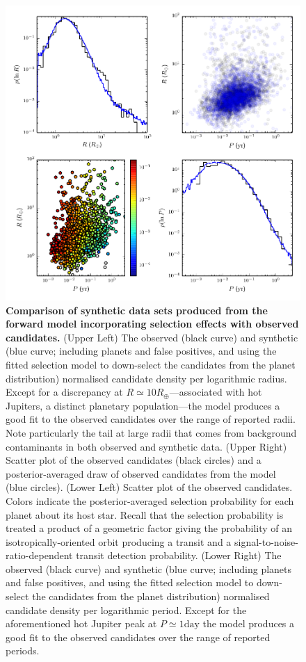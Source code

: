 \documentclass{nature}
\newcommand{\REarth}{R_\oplus}
\begin{document}
\begin{figure}
  \includegraphics[width=\columnwidth]{selection}
  \caption{\label{fig:selection} \textbf{Comparison of synthetic data
      sets produced from the forward model incorporating selection
      effects with observed candidates.}  (Upper Left) The observed
    (black curve) and synthetic (blue curve; including planets and
    false positives, and using the fitted selection model to
    down-select the candidates from the planet distribution)
    normalised candidate density per logarithmic radius.  Except for a
    discrepancy at $R \simeq 10 \REarth$---associated with hot
    Jupiters, a distinct planetary
    population\cite{Albrecht2012,Naoz2012}---the model produces a good
    fit to the observed candidates over the range of reported radii.
    Note particularly the tail at large radii that comes from
    background contaminants in both observed and synthetic data.
    (Upper Right) Scatter plot of the observed candidates (black
    circles) and a posterior-averaged draw of observed candidates from
    the model (blue circles).  (Lower Left) Scatter plot of the
    observed candidates.  Colors indicate the posterior-averaged
    selection probability for each planet about its host star.  Recall
    that the selection probability is treated a product of a geometric
    factor giving the probability of an isotropically-oriented orbit
    producing a transit and a signal-to-noise-ratio-dependent transit
    detection probability.  (Lower Right) The observed (black curve)
    and synthetic (blue curve; including planets and false positives,
    and using the fitted selection model to down-select the candidates
    from the planet distribution) normalised candidate density per
    logarithmic period.  Except for the aforementioned hot Jupiter
    peak at $P \simeq 1 \mathrm{day}$ the model produces a good fit to
    the observed candidates over the range of reported periods.}
\end{figure}
\end{document}
